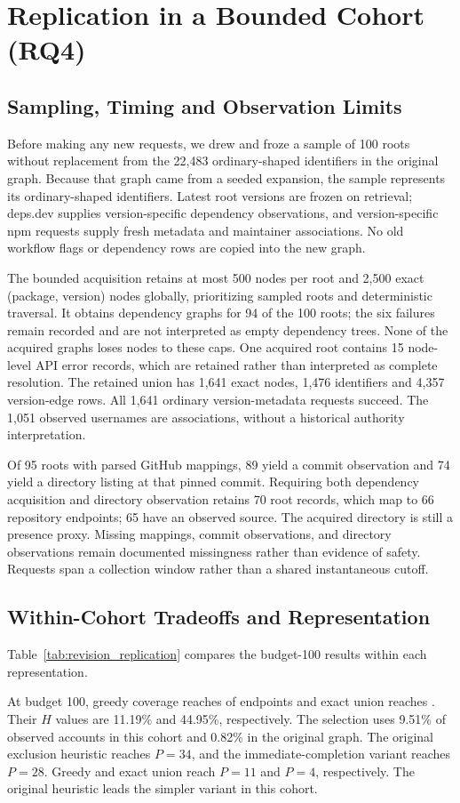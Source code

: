 \section{Replication in a Bounded Cohort (RQ4)}
\label{sec:new_acquisition}
\subsection{Sampling, Timing and Observation Limits}
Before making any new requests, we drew and froze a sample of 100 roots without replacement from the 22,483 ordinary-shaped identifiers in the original graph. Because that graph came from a seeded expansion, the sample represents its ordinary-shaped identifiers. Latest root versions are frozen on retrieval; deps.dev supplies version-specific dependency observations, and version-specific npm requests supply fresh metadata and maintainer associations. No old workflow flags or dependency rows are copied into the new graph.

The bounded acquisition retains at most 500 nodes per root and 2,500 exact (package, version) nodes globally, prioritizing sampled roots and deterministic traversal. It obtains dependency graphs for 94 of the 100 roots; the six failures remain recorded and are not interpreted as empty dependency trees. None of the acquired graphs loses nodes to these caps. One acquired root contains 15 node-level API error records, which are retained rather than interpreted as complete resolution. The retained union has 1,641 exact nodes, 1,476 identifiers and 4,357 version-edge rows. All 1,641 ordinary version-metadata requests succeed. The 1,051 observed usernames are associations, without a historical authority interpretation.

Of 95 roots with parsed GitHub mappings, 89 yield a commit observation and 74 yield a directory listing at that pinned commit. Requiring both dependency acquisition and directory observation retains 70 root records, which map to 66 repository endpoints; 65 have an observed source. The acquired directory is still a presence proxy. Missing mappings, commit observations, and directory observations remain documented missingness rather than evidence of safety. Requests span a collection window rather than a shared instantaneous cutoff.

\subsection{Within-Cohort Tradeoffs and Representation}
Table~\ref{tab:revision_replication} compares the budget-100 results within each representation.

At budget 100, greedy coverage reaches \ReplicationGreedyC{} of \ReplicationEndpoints{} endpoints and exact union reaches \ReplicationUnionC{}. Their $H$ values are 11.19\% and 44.95\%, respectively. The selection uses 9.51\% of observed accounts in this cohort and 0.82\% in the original graph. The original exclusion heuristic reaches $P=34$, and the immediate-completion variant reaches $P=28$. Greedy and exact union reach $P=11$ and $P=4$, respectively. The original heuristic leads the simpler variant in this cohort.

